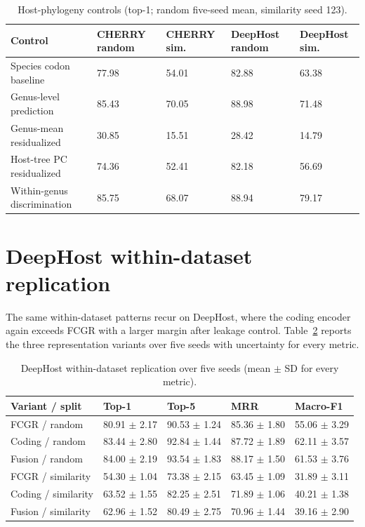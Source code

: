 \documentclass[utf8]{frontiers_suppmat}
\begin{document}
\begin{table}[ht]
\centering
\renewcommand{\arraystretch}{1.25}
\caption{Host-phylogeny controls (top-1; random five-seed mean, similarity seed 123).}\label{tab:S7}
\footnotesize
\begin{tabular}{l l l l l}
\hline
Control & CHERRY random & CHERRY sim. & DeepHost random & DeepHost sim. \\
\hline
Species codon baseline & 77.98 & 54.01 & 82.88 & 63.38 \\
Genus-level prediction & 85.43 & 70.05 & 88.98 & 71.48 \\
Genus-mean residualized & 30.85 & 15.51 & 28.42 & 14.79 \\
Host-tree PC residualized & 74.36 & 52.41 & 82.18 & 56.69 \\
Within-genus discrimination & 85.75 & 68.07 & 88.94 & 79.17 \\
\hline
\end{tabular}
\end{table}

\section{DeepHost within-dataset replication}

The same within-dataset patterns recur on DeepHost, where the coding encoder again exceeds
FCGR with a larger margin after leakage control. Table~\ref{tab:S8} reports the three
representation variants over five seeds with uncertainty for every metric.

\begin{table}[ht]
\centering
\renewcommand{\arraystretch}{1.25}
\caption{DeepHost within-dataset replication over five seeds (mean $\pm$ SD for every metric).}\label{tab:S8}
\footnotesize
\begin{tabular}{l l l l l}
\hline
Variant / split & Top-1 & Top-5 & MRR & Macro-F1 \\
\hline
FCGR / random & 80.91 $\pm$ 2.17 & 90.53 $\pm$ 1.24 & 85.36 $\pm$ 1.80 & 55.06 $\pm$ 3.29 \\
Coding / random & 83.44 $\pm$ 2.80 & 92.84 $\pm$ 1.44 & 87.72 $\pm$ 1.89 & 62.11 $\pm$ 3.57 \\
Fusion / random & 84.00 $\pm$ 2.19 & 93.54 $\pm$ 1.83 & 88.17 $\pm$ 1.50 & 61.53 $\pm$ 3.76 \\
FCGR / similarity & 54.30 $\pm$ 1.04 & 73.38 $\pm$ 2.15 & 63.45 $\pm$ 1.09 & 31.89 $\pm$ 3.11 \\
Coding / similarity & 63.52 $\pm$ 1.55 & 82.25 $\pm$ 2.51 & 71.89 $\pm$ 1.06 & 40.21 $\pm$ 1.38 \\
Fusion / similarity & 62.96 $\pm$ 1.52 & 80.49 $\pm$ 2.75 & 70.96 $\pm$ 1.44 & 39.16 $\pm$ 2.90 \\
\hline
\end{tabular}
\end{table}
\end{document}
